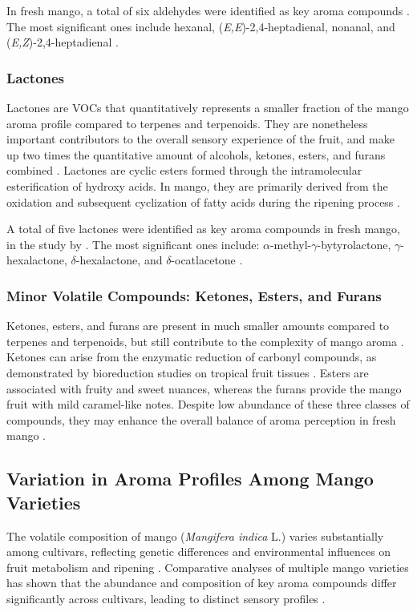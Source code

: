 \vspace{1em}
In fresh mango, a total of six aldehydes were identified as key aroma compounds \cite*{A07_Bonneau2016}. The most significant ones include hexanal, (\textit{E,E})-2,4-heptadienal, nonanal, and (\textit{E,Z})-2,4-heptadienal \cite*{A07_Bonneau2016}.

\subsubsection*{Lactones}
Lactones are VOCs that quantitatively represents a smaller fraction of the mango aroma profile compared to terpenes and terpenoids. They are nonetheless important contributors to the overall sensory experience of the fruit, and make up two times the quantitative amount of alcohols, ketones, esters, and furans combined \cite*{A14_Silva2021, A07_Bonneau2016}. Lactones are cyclic esters formed through the intramolecular esterification of hydroxy acids. In mango, they are primarily derived from the oxidation and subsequent cyclization of fatty acids during the ripening process \cite*{A13_ElHadi2013}.

\vspace{1em}
A total of five lactones were identified as key aroma compounds in fresh mango, in the study by \textcite*{A07_Bonneau2016}. The most significant ones include: $\alpha$-methyl-$\gamma$-bytyrolactone, $\gamma$-hexalactone, $\delta$-hexalactone, and $\delta$-ocatlacetone \cite*{A07_Bonneau2016}.

\subsubsection*{Minor Volatile Compounds: Ketones, Esters, and Furans}
Ketones, esters, and furans are present in much smaller amounts compared to terpenes and terpenoids, but still contribute to the complexity of mango aroma \cite*{A07_Bonneau2016}. Ketones can arise from the enzymatic reduction of carbonyl compounds, as demonstrated by bioreduction studies on tropical fruit tissues \cite*{A12_Lemos2008}. Esters are associated with fruity and sweet nuances, whereas the furans provide the mango fruit with mild caramel-like notes. Despite low abundance of these three classes of compounds, they may enhance the overall balance of aroma perception in fresh mango \cite*{A13_ElHadi2013}.

\subsection{Variation in Aroma Profiles Among Mango Varieties}
The volatile composition of mango (\textit{Mangifera indica} L.) varies substantially among cultivars, reflecting genetic differences and environmental influences on fruit metabolism and ripening \cite*{A01_Aguirre-Lopez_2023}. Comparative analyses of multiple mango varieties has shown that the abundance and composition of key aroma compounds differ significantly across cultivars, leading to distinct sensory profiles \cite*{A01_Aguirre-Lopez_2023,A02_Moreno2010}. 

